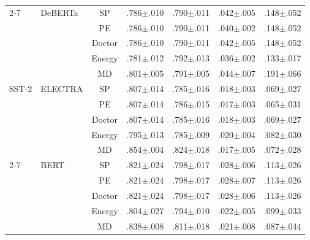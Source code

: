 \begin{table}[h]
\begin{tabular}{@{}llccccc@{}}
\cmidrule(l){2-7}
 & DeBERTa & SP & .786{\scriptsize$\pm$.010} & .790{\scriptsize$\pm$.011} & .042{\scriptsize$\pm$.005} & .148{\scriptsize$\pm$.052} \\
 &  & PE & .786{\scriptsize$\pm$.010} & .790{\scriptsize$\pm$.011} & .040{\scriptsize$\pm$.002} & .148{\scriptsize$\pm$.052} \\
 &  & Doctor & .786{\scriptsize$\pm$.010} & .790{\scriptsize$\pm$.011} & .042{\scriptsize$\pm$.005} & .148{\scriptsize$\pm$.052} \\
 &  & Energy & .781{\scriptsize$\pm$.012} & .792{\scriptsize$\pm$.013} & .036{\scriptsize$\pm$.002} & .133{\scriptsize$\pm$.017} \\
 &  & MD & .801{\scriptsize$\pm$.005} & .791{\scriptsize$\pm$.005} & .044{\scriptsize$\pm$.007} & .191{\scriptsize$\pm$.066} \\
\midrule
SST-2 & ELECTRA & SP & .807{\scriptsize$\pm$.014} & .785{\scriptsize$\pm$.016} & .018{\scriptsize$\pm$.003} & .069{\scriptsize$\pm$.027} \\
 &  & PE & .807{\scriptsize$\pm$.014} & .786{\scriptsize$\pm$.015} & .017{\scriptsize$\pm$.003} & .065{\scriptsize$\pm$.031} \\
 &  & Doctor & .807{\scriptsize$\pm$.014} & .785{\scriptsize$\pm$.016} & .018{\scriptsize$\pm$.003} & .069{\scriptsize$\pm$.027} \\
 &  & Energy & .795{\scriptsize$\pm$.013} & .785{\scriptsize$\pm$.009} & .020{\scriptsize$\pm$.004} & .082{\scriptsize$\pm$.030} \\
 &  & MD & .854{\scriptsize$\pm$.004} & .824{\scriptsize$\pm$.018} & .017{\scriptsize$\pm$.005} & .072{\scriptsize$\pm$.028} \\
\cmidrule(l){2-7}
 & BERT & SP & .821{\scriptsize$\pm$.024} & .798{\scriptsize$\pm$.017} & .028{\scriptsize$\pm$.006} & .113{\scriptsize$\pm$.026} \\
 &  & PE & .821{\scriptsize$\pm$.024} & .798{\scriptsize$\pm$.017} & .028{\scriptsize$\pm$.007} & .113{\scriptsize$\pm$.026} \\
 &  & Doctor & .821{\scriptsize$\pm$.024} & .798{\scriptsize$\pm$.017} & .028{\scriptsize$\pm$.006} & .113{\scriptsize$\pm$.026} \\
 &  & Energy & .804{\scriptsize$\pm$.027} & .794{\scriptsize$\pm$.010} & .022{\scriptsize$\pm$.005} & .099{\scriptsize$\pm$.033} \\
 &  & MD & .838{\scriptsize$\pm$.008} & .811{\scriptsize$\pm$.018} & .021{\scriptsize$\pm$.008} & .087{\scriptsize$\pm$.044} \\

\end{tabular}
\end{table}
